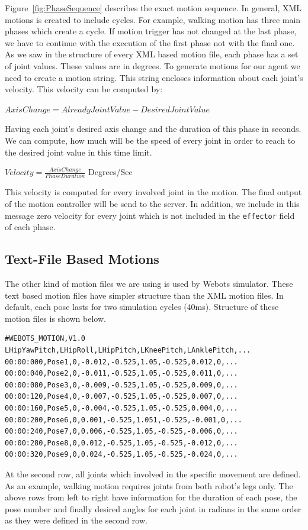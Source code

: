 Figure~\ref{fig:PhaseSequence} describes the exact motion sequence. In general, XML motions is created to include cycles. For example, walking motion has three main phases which create a cycle. If motion trigger has not changed at the last phase, we have to continue with the execution of the first phase not with the final one. As we saw in the structure of every XML based motion file, each phase has a set of joint values. These values are in degrees. To generate motions for our agent we need to create a motion string. This string encloses information about each joint's velocity. This velocity can be computed by:
\begin{center}
$Axis Change = Already Joint Value - Desired Joint Value$
\end{center}
Having each joint's desired axis change and the duration of this phase in seconds. We can compute, how much will be the speed of every joint in order to reach to the desired joint value in this time limit.
\begin{center}
$Velocity = \frac {Axis Change} {PhaseDuration} $ Degrees/Sec
\end{center}
This velocity is computed for every involved joint in the motion. The final output of the motion controller will be send to the server. In addition, we include in this message zero velocity for every joint which is not included in the \texttt{effector} field of each phase.



\subsection{Text-File Based Motions}
The other kind of motion files we are using is used by Webots simulator. These text based motion files have simpler structure than the XML motion files. In default, each pose lasts for two simulation cycles (40ms). Structure of these motion files is shown below.
\begin{verbatim}
#WEBOTS_MOTION,V1.0
LHipYawPitch,LHipRoll,LHipPitch,LKneePitch,LAnklePitch,...
00:00:000,Pose1,0,-0.012,-0.525,1.05,-0.525,0.012,0,...
00:00:040,Pose2,0,-0.011,-0.525,1.05,-0.525,0.011,0,...
00:00:080,Pose3,0,-0.009,-0.525,1.05,-0.525,0.009,0,...
00:00:120,Pose4,0,-0.007,-0.525,1.05,-0.525,0.007,0,...
00:00:160,Pose5,0,-0.004,-0.525,1.05,-0.525,0.004,0,...
00:00:200,Pose6,0,0.001,-0.525,1.051,-0.525,-0.001,0,...
00:00:240,Pose7,0,0.006,-0.525,1.05,-0.525,-0.006,0,...
00:00:280,Pose8,0,0.012,-0.525,1.05,-0.525,-0.012,0,...
00:00:320,Pose9,0,0.024,-0.525,1.05,-0.525,-0.024,0,...
\end{verbatim}
At the second row, all joints which involved in the specific movement are defined. As an example, walking motion requires joints from both robot's legs only. The above rows from left to right have information for the duration of each pose, the pose number and finally desired angles for each joint in radians in the same order as they were defined in the second row.


